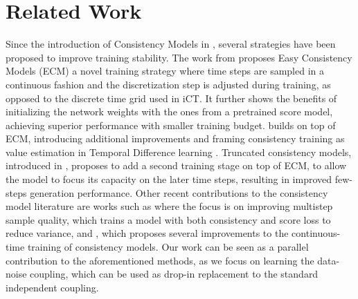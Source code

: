 \section{Related Work}
Since the introduction of Consistency Models in \citep{song2023consistency, songimproved}, several strategies have been proposed to improve training stability. The work from \citep{geng2024consistency} proposes Easy Consistency Models (ECM) a novel training strategy where time steps are sampled in a continuous fashion and the discretization step is adjusted during training, as opposed to the discrete time grid used in iCT. It further shows the benefits of initializing the network weights with the ones from a pretrained score model, achieving superior performance with smaller training budget. \citep{wang2024stable} builds on top of ECM, introducing additional improvements and framing consistency training as value estimation in Temporal Difference learning \citep{sutton2018reinforcement}. Truncated consistency models, introduced in \citep{lee2024truncated}, proposes to add a second training stage on top of ECM, to allow the model to focus its capacity on the later time steps, resulting in improved few-steps generation performance. Other recent contributions to the consistency model literature are works such as \citep{kimconsistency, heek2024multistep} where the focus is on improving multistep sample quality, \citep{lee2024stabilizing} which trains a model with both consistency and score loss to reduce variance, and \citep{lu2024simplifying}, which proposes several improvements to the continuous-time training of consistency models. Our work can be seen as a parallel contribution to the aforementioned methods, as we focus on learning the data-noise coupling, which can be used as drop-in replacement to the standard independent coupling.

